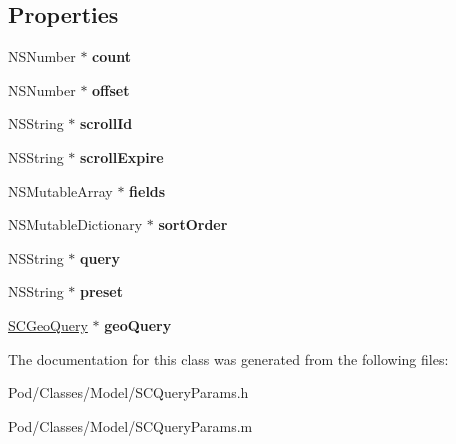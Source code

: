 \subsection*{Properties}
\begin{DoxyCompactItemize}
\item 
N\+S\+Number $\ast$ {\bfseries count}\hypertarget{interface_s_c_query_params_ab448b7ad4d81cc1246fbd78c59c6c6c8}{}\label{interface_s_c_query_params_ab448b7ad4d81cc1246fbd78c59c6c6c8}

\item 
N\+S\+Number $\ast$ {\bfseries offset}\hypertarget{interface_s_c_query_params_a25d561316d53d72e9fc6354cfdb16913}{}\label{interface_s_c_query_params_a25d561316d53d72e9fc6354cfdb16913}

\item 
N\+S\+String $\ast$ {\bfseries scroll\+Id}\hypertarget{interface_s_c_query_params_a3afd9bf90bdb4e9e80b8baa3204066c9}{}\label{interface_s_c_query_params_a3afd9bf90bdb4e9e80b8baa3204066c9}

\item 
N\+S\+String $\ast$ {\bfseries scroll\+Expire}\hypertarget{interface_s_c_query_params_ac3c31ecee5459da47c33e632a89caf5f}{}\label{interface_s_c_query_params_ac3c31ecee5459da47c33e632a89caf5f}

\item 
N\+S\+Mutable\+Array $\ast$ {\bfseries fields}\hypertarget{interface_s_c_query_params_a5bdab64fb54c805493ddba9aaa9d9cb2}{}\label{interface_s_c_query_params_a5bdab64fb54c805493ddba9aaa9d9cb2}

\item 
N\+S\+Mutable\+Dictionary $\ast$ {\bfseries sort\+Order}\hypertarget{interface_s_c_query_params_a791cfe68eeb6679b2dd8f52546cdbc57}{}\label{interface_s_c_query_params_a791cfe68eeb6679b2dd8f52546cdbc57}

\item 
N\+S\+String $\ast$ {\bfseries query}\hypertarget{interface_s_c_query_params_a33f14f88932085ce64a9cff794ba53c0}{}\label{interface_s_c_query_params_a33f14f88932085ce64a9cff794ba53c0}

\item 
N\+S\+String $\ast$ {\bfseries preset}\hypertarget{interface_s_c_query_params_af84ae9fabb0d7e551d4418d5855476ee}{}\label{interface_s_c_query_params_af84ae9fabb0d7e551d4418d5855476ee}

\item 
\hyperlink{interface_s_c_geo_query}{S\+C\+Geo\+Query} $\ast$ {\bfseries geo\+Query}\hypertarget{interface_s_c_query_params_a438b494d3af7f1534b64af44e5990ec0}{}\label{interface_s_c_query_params_a438b494d3af7f1534b64af44e5990ec0}

\end{DoxyCompactItemize}


The documentation for this class was generated from the following files\+:\begin{DoxyCompactItemize}
\item 
Pod/\+Classes/\+Model/S\+C\+Query\+Params.\+h\item 
Pod/\+Classes/\+Model/S\+C\+Query\+Params.\+m\end{DoxyCompactItemize}
